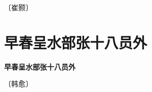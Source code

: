 \documentclass[12pt,UTF-8,openany,fontset=none]{ctexbook}
\begin{document}
\begin{center}
    \vspace{10pt}
    
    \begin{large}
        
        〔崔颢〕
        
    \end{large}
    
    \vspace{8pt}
    
    \begin{huge}
        
        
        
        
        
    \end{huge}
    
\end{center}

\vspace{8pt}
\clearpage

\section{早春呈水部张十八员外}



\begin{center}
    {\bfseries 早春呈水部张十八员外}
\end{center}

\begin{center}
    \vspace{10pt}
    
    \begin{large}
        
        〔韩愈〕
        
    \end{large}
    
    \vspace{8pt}
    
    \begin{huge}
        
        \phantom{。}

        \phantom{。}
        
        \phantom{。}

        \phantom{。}~~
        
    \end{huge}
    
\end{center}
\end{document}
